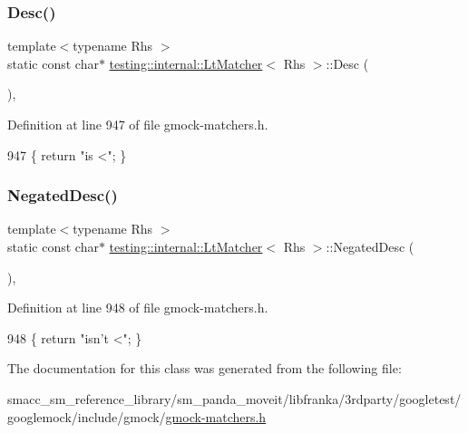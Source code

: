 \subsubsection{\texorpdfstring{Desc()}{Desc()}}
{\footnotesize\ttfamily template$<$typename Rhs $>$ \\
static const char$\ast$ \hyperlink{classtesting_1_1internal_1_1LtMatcher}{testing\+::internal\+::\+Lt\+Matcher}$<$ Rhs $>$\+::Desc (\begin{DoxyParamCaption}{ }\end{DoxyParamCaption})\hspace{0.3cm}{\ttfamily [inline]}, {\ttfamily [static]}}



Definition at line 947 of file gmock-\/matchers.\+h.


\begin{DoxyCode}
947 \{ \textcolor{keywordflow}{return} \textcolor{stringliteral}{"is <"}; \}
\end{DoxyCode}
\mbox{\label{classtesting_1_1internal_1_1LtMatcher_ab62db503e9e0293b4a2d22a96c140b10}} 
\subsubsection{\texorpdfstring{Negated\+Desc()}{NegatedDesc()}}
{\footnotesize\ttfamily template$<$typename Rhs $>$ \\
static const char$\ast$ \hyperlink{classtesting_1_1internal_1_1LtMatcher}{testing\+::internal\+::\+Lt\+Matcher}$<$ Rhs $>$\+::Negated\+Desc (\begin{DoxyParamCaption}{ }\end{DoxyParamCaption})\hspace{0.3cm}{\ttfamily [inline]}, {\ttfamily [static]}}



Definition at line 948 of file gmock-\/matchers.\+h.


\begin{DoxyCode}
948 \{ \textcolor{keywordflow}{return} \textcolor{stringliteral}{"isn't <"}; \}
\end{DoxyCode}


The documentation for this class was generated from the following file\+:\begin{DoxyCompactItemize}
\item 
smacc\+\_\+sm\+\_\+reference\+\_\+library/sm\+\_\+panda\+\_\+moveit/libfranka/3rdparty/googletest/googlemock/include/gmock/\hyperlink{gmock-matchers_8h}{gmock-\/matchers.\+h}\end{DoxyCompactItemize}

